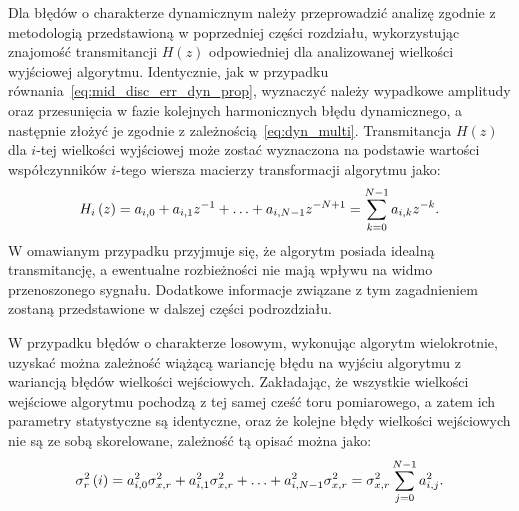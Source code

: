 Dla błędów o charakterze dynamicznym należy przeprowadzić analizę zgodnie z metodologią przedstawioną w poprzedniej części rozdziału, wykorzystując znajomość transmitancji $H(z)$ odpowiedniej dla analizowanej wielkości wyjściowej algorytmu. Identycznie, jak w przypadku równania~\eqref{eq:mid_disc_err_dyn_prop}, wyznaczyć należy wypadkowe amplitudy oraz przesunięcia w fazie kolejnych harmonicznych błędu dynamicznego, a następnie złożyć je zgodnie z zależnością~\eqref{eq:dyn_multi}. Transmitancja $H(z)$ dla $i$-tej wielkości wyjściowej może zostać wyznaczona na podstawie wartości współczynników $i$-tego wiersza macierzy transformacji algorytmu jako:
\begin{equation}
H_{i} \left(z\right) = a_{i, 0} + a_{i, 1} z^{-1} + \hdots + a_{i, N-1} z^{-N+1} = \sum _{k = 0} ^{N-1} a_{i, k} z^{-k} \label{eq:alg_trans_single}.
\end{equation}
W omawianym przypadku przyjmuje się, że algorytm posiada idealną transmitancję, a ewentualne rozbieżności nie mają wpływu na widmo przenoszonego sygnału. Dodatkowe informacje związane z tym zagadnieniem zostaną przedstawione w dalszej części podrozdziału.

W przypadku błędów o charakterze losowym, wykonując algorytm wielokrotnie, uzyskać można zależność wiążącą wariancję błędu na wyjściu algorytmu z wariancją błędów wielkości wejściowych. Zakładając, że wszystkie wielkości wejściowe algorytmu pochodzą z tej samej cześć toru pomiarowego, a zatem ich parametry statystyczne są identyczne, oraz że kolejne błędy wielkości wejściowych nie są ze sobą skorelowane, zależność tą opisać można jako:
\begin{equation}
\sigma_{r}^{2} \left(i\right) = a_{i, 0}^{2} \sigma_{x,r}^{2} + a_{i, 1}^{2} \sigma_{x,r}^{2} + \hdots + a_{i, N-1}^{2} \sigma_{x,r}^{2} = \sigma_{x,r}^{2} \sum _{j=0} ^{N-1} {a_{i, j}^{2}} \label{eq:alg_outvar_rand}.
\end{equation}

